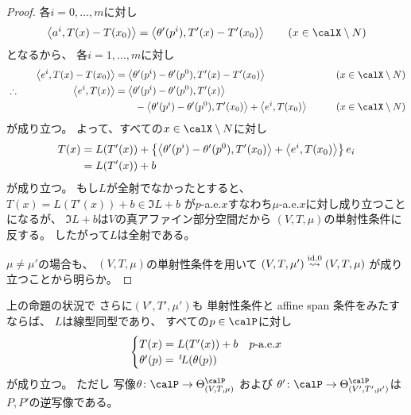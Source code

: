 \documentclass[report]{jlreq}
\begin{document}
\begin{proof}
    各$i = 0, \dots, m$に対し
    \begin{equation}
        \myangle{a^i}{T(x) - T(x_0)}
            =
                \myangle{\theta'(p^i)}{T'(x) - T'(x_0)}
            \qquad
                (x \in \calX \setminus N)
    \end{equation}
    となるから、
    各$i = 1, \dots, m$に対し
    \begin{alignat}{3}
        &\phantom{\therefore}&
            \myangle{e^i}{T(x) - T(x_0)}
            &=
                \myangle{\theta'(p^i) - \theta'(p^0)}{T'(x) - T'(x_0)}
                &&\qquad
                (x \in \calX \setminus N)
                \\
        &\therefore \quad&
            \myangle{e^i}{T(x)}
            &=
                \myangle{\theta'(p^i) - \theta'(p^0)}{T'(x)}
                \\
        &&&\qquad
            -
            \myangle{\theta'(p^i) - \theta'(p^0)}{T'(x_0)}
            +
            \myangle{e^i}{T(x_0)}
            &&\qquad
            (x \in \calX \setminus N)
    \end{alignat}
    が成り立つ。
    よって、すべての$x \in \calX \setminus N$に対し
    \begin{alignat}{1}
        T(x)
            &=
                L(T'(x))
                + \left\{{
                    \left\langle{\theta'(p^i) - \theta'(p^0)},{T'(x_0)}\right\rangle
                    +
                    \left\langle{e^i},{T(x_0)}\right\rangle
                }\right\} e_i
                \\
            &=
                L(T'(x))
                + b
    \end{alignat}
    が成り立つ。
    もし$L$が全射でなかったとすると、
    $T(x) = L(T'(x)) + b \in \Im L + b$
    が$p$-a.e.$x$すなわち$\mu$-a.e.$x$に対し成り立つことになるが、
    $\Im L + b$は$V$の真アファイン部分空間だから
    $(V, T, \mu)$の単射性条件に反する。
    したがって$L$は全射である。

    $\mu \neq \mu'$の場合も、
    $(V, T, \mu)$の単射性条件を用いて
    $(V, T, \mu') \stackrel{\mathrm{id}, 0}{\leadsto} (V, T, \mu)$
    が成り立つことから明らか。
\end{proof}

\begin{corollary}
    上の命題の状況で
    さらに$(V', T', \mu')$も
    単射性条件と affine span 条件をみたすならば、
    $L$は線型同型であり、
    すべての$p \in \calP$に対し
    \begin{equation}
        \begin{cases}
            T(x) = L(T'(x)) + b & \text{$p$-a.e.$x$} \\
            \theta'(p) = \,{}^{t}\!L(\theta(p))
        \end{cases}
    \end{equation}
    が成り立つ。
    ただし
    写像$\theta \colon \calP \to \Theta^\calP_{(V, T, \mu)}$
    および
    $\theta' \colon \calP \to \Theta^\calP_{(V', T', \mu')}$は
    $P, P'$の逆写像である。
\end{corollary}
\end{document}
